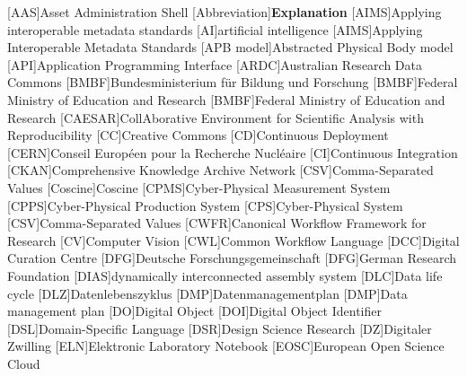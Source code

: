 


\begin{acronym}[Abbreviations]\itemsep0pt
    [AAS]{Asset Administration Shell}
    [Abbreviation]{\textbf{Explanation}}
    [AIMS]{Applying interoperable metadata standards}
    [AI]{artificial intelligence}
    [AIMS]{Applying Interoperable Metadata Standards}
    [APB model]{Abstracted Physical Body model}
    [API]{Application Programming Interface}
    [ARDC]{Australian Research Data Commons}
	[BMBF]{Bundesministerium für Bildung und Forschung}
    [BMBF]{Federal Ministry of Education and Research}
	[BMBF]{Federal Ministry of Education and Research}
    [CAESAR]{CollAborative Environment for Scientific Analysis with Reproducibility}
    [CC]{Creative Commons}
    [CD]{Continuous Deployment}
    [CERN]{Conseil Européen pour la Recherche Nucléaire}
    [CI]{Continuous Integration}
    [CKAN]{Comprehensive Knowledge Archive Network}
    [CSV]{Comma-Separated Values}
    [Coscine]{Coscine}
    [CPMS]{Cyber-Physical Measurement System}
    [CPPS]{Cyber-Physical Production System}
    [CPS]{Cyber-Physical System}
    [CSV]{Comma-Separated Values}
    [CWFR]{Canonical Workflow Framework for Research}
	[CV]{Computer Vision}
    [CWL]{Common Workflow Language}
    [DCC]{Digital Curation Centre}
	[DFG]{Deutsche Forschungsgemeinschaft}
	[DFG]{German Research Foundation}
    [DIAS]{dynamically interconnected assembly system}
    [DLC]{Data life cycle}
	[DLZ]{Datenlebenszyklus}
	[DMP]{Datenmanagementplan}
	[DMP]{Data management plan}
    [DO]{Digital Object}
    [DOI]{Digital Object Identifier}
	[DSL]{Domain-Specific Language}
	[DSR]{Design Science Research}
    [DZ]{Digitaler Zwilling}
    [ELN]{Elektronic Laboratory Notebook}
    [EOSC]{European Open Science Cloud}

\end{acronym}
